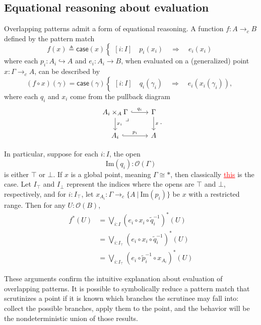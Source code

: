 \documentclass[conference]{IEEEtran}
\newcommand{\hookto}{\hookrightarrow}
\newcommand{\cto}{\to_c}
\newcommand{\suchthat}{\ |\ }
\newcommand{\One}{\ast}
\newcommand{\Open}[1]{\mathcal{O}({#1})}
\newcommand{\Img}[1]{\text{Im}\left({#1}\right)}
\newcommand{\Branch}{\Rightarrow}
\newcommand{\iimg}[1]{#1^*}
\newcommand{\grammar}[1]{\textcolor{red}{\underline{#1}}}
\begin{document}
\subsection{Equational reasoning about evaluation}

Overlapping patterns admit a form of equational reasoning. A function $f : A \cto B$ defined by the pattern match
\[
f(x) \triangleq \mathsf{case}(x)
\begin{cases}
[i : I] \quad p_i(x_i) \quad \Branch \quad e_i(x_i)
\end{cases}
\]
where each $p_i : A_i \hookto A$ and $e_i : A_i \to B$,
when evaluated on a (generalized) point $x : \Gamma \cto A$,
can be described by
\[
(f \circ x)(\gamma) = \mathsf{case}(\gamma)
\begin{cases}
[i : I] \quad q_i(\gamma_i) \quad \Branch \quad e_i(x_i(\gamma_i)),
\end{cases}
\]
where each $q_i$ and $x_i$ come from the pullback diagram
\begin{equation*}
\begin{tikzcd}
A_i \times_A \Gamma \arrow[r, hook, "q_i"]
   \arrow[d, "x_i"]
   \arrow[dr, phantom, "\lrcorner", very near start]
& \Gamma \arrow[d, "x"]
\\ A_i \arrow[r, hook, "p_i"]
& A
\end{tikzcd}.
\end{equation*}

In particular, suppose for each $i : I$, the open
\[
\Img{q_i} : \Open{\Gamma}
\]
is either $\top$ or $\bot$. If $x$ is a global point, meaning $\Gamma \cong \One$, then classically \grammar{this} is the case. Let $I_\top$ and $I_\bot$ represent the indices where the opens are $\top$ and $\bot$, respectively, and for $i : I_\top$, let $x_{A_i} : \Gamma \cto \{ A \suchthat \Img{p_i} \}$ be $x$ with a restricted range. Then for any $U : \Open{B}$,
\begin{align*}
\iimg{f}(U) &= \bigvee_{i : I} \iimg{(e_i \circ x_i \circ \tilde{q}_i^{-1})}(U)
\\ &= \bigvee_{i : I_\top} \iimg{(e_i \circ x_i \circ \tilde{q}_i^{-1})}(U)
\\ &= \bigvee_{i : I_\top} \iimg{(e_i \circ \tilde{p}_i^{-1} \circ x_{A_i})}(U)
\end{align*}

These arguments confirm the intuitive explanation about evaluation of overlapping patterns. It is possible to symbolically reduce a pattern match that scrutinizes a point if it is known which branches the scrutinee may fall into: collect the possible branches, apply them to the point, and the behavior will be the nondeterministic union of those results.
\end{document}
